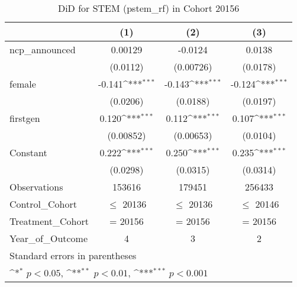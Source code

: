 \begin{table}[htbp]\centering
\def\sym#1{\ifmmode^{#1}\else\(^{#1}\)\fi}
\caption{DiD for STEM (pstem\_rf) in Cohort 20156}
\begin{tabular}{l*{3}{c}}
\toprule
                &\multicolumn{1}{c}{(1)}         &\multicolumn{1}{c}{(2)}         &\multicolumn{1}{c}{(3)}         \\
\midrule
ncp\_announced   &  0.00129         &  -0.0124         &   0.0138         \\
                & (0.0112)         &(0.00726)         & (0.0178)         \\
\addlinespace
female          &   -0.141\sym{***}&   -0.143\sym{***}&   -0.124\sym{***}\\
                & (0.0206)         & (0.0188)         & (0.0197)         \\
\addlinespace
firstgen        &    0.120\sym{***}&    0.112\sym{***}&    0.107\sym{***}\\
                &(0.00852)         &(0.00653)         & (0.0104)         \\
\addlinespace
Constant        &    0.222\sym{***}&    0.250\sym{***}&    0.235\sym{***}\\
                & (0.0298)         & (0.0315)         & (0.0314)         \\
\midrule
Observations    &   153616         &   179451         &   256433         \\
Control\_Cohort  &$\le$ 20136         &$\le$ 20136         &$\le$ 20146         \\
Treatment\_Cohort&  = 20156         &  = 20156         &  = 20156         \\
Year\_of\_Outcome &        4         &        3         &        2         \\
\bottomrule
\multicolumn{4}{l}{\footnotesize Standard errors in parentheses}\\
\multicolumn{4}{l}{\footnotesize \sym{*} \(p<0.05\), \sym{**} \(p<0.01\), \sym{***} \(p<0.001\)}\\
\end{tabular}
\end{table}
